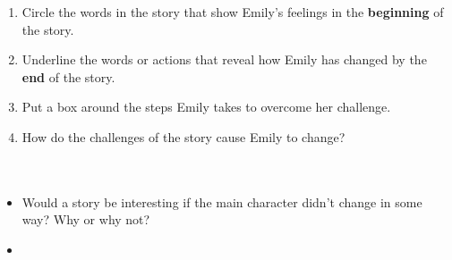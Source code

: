 \documentclass[12pt]{article}
\begin{document}
\vspace{1em}

\begin{tcolorbox}[colframe=black!60, colback=white, 
coltitle=black, colbacktitle=black!15, fonttitle=\bfseries\Large, 
title=Independent Practice, halign title=center, left=10pt, right=10pt, top=10pt, bottom=15pt]
\begin{enumerate}[itemsep=1em]
    \item     Circle the words in the story that show Emily’s feelings in the \textbf{beginning }of the story.
    \item Underline the words or actions that reveal how Emily has changed by the \textbf{end} of the story.
    \item Put a box around the steps Emily takes to overcome her challenge.
    \item How do the challenges of the story cause Emily to change?
    \\[0.8cm] \underline{\hspace{14cm}}  
    \\[0.8cm] \underline{\hspace{14cm}}  
    \\[0.8cm] \underline{\hspace{14cm}} 
\end{enumerate}
\end{tcolorbox}

\vspace{1em}

\begin{tcolorbox}[colframe=black!60, colback=white, 
coltitle=black, colbacktitle=black!15, fonttitle=\bfseries\Large, 
title=Exit Ticket, halign title=center, left=10pt, right=10pt, top=10pt, bottom=15pt]
\begin{itemize}
    \item Would a story be interesting if the main character didn't change in some way? Why or why not?
    \item \vspace{8cm}
\end{itemize}
\end{tcolorbox}
\end{document}
